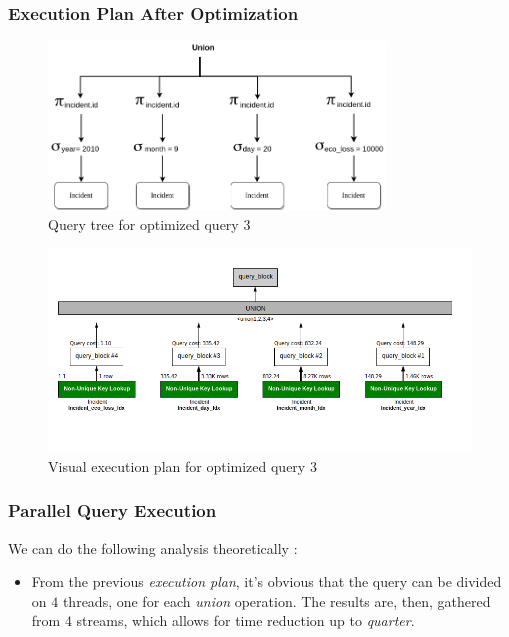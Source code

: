 \subsubsection{Execution Plan After Optimization}
\begin{figure}[H]
    \centering
    \includegraphics[width=0.8\textwidth]{images/query_trees/query3-optimized-and-non-optimized.png}
    \caption{Query tree for optimized query 3}
\end{figure}
\begin{figure}[H]
    \centering
    \includegraphics[width=\textwidth]{images/execution_plans/q3-3-new.png}
    \caption{Visual execution plan for optimized query 3}
\end{figure}

\subsubsection{Parallel Query Execution}
We can do the following analysis theoretically :
\begin{itemize}
    \item From the previous \emph{execution plan}, it's obvious that the query can be divided on $4$ threads, one for each \emph{union} operation. The results are, then, gathered from $4$ streams, which allows for time reduction up to \emph{quarter}.
\end{itemize}

